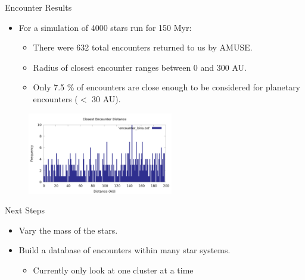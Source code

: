 \documentclass{beamer}
\begin{document}
\begin{frame}{Encounter Results}
    \begin{itemize}
        \item For a simulation of 4000 stars run for 150 Myr:
            \begin{itemize}
                \item There were 632 total encounters returned to us by AMUSE.
                \item Radius of closest encounter ranges between 0 and 300 AU.
                \item Only 7.5 \% of encounters are close enough to be
                    considered for planetary encounters ($<$ 30 AU).
            \end{itemize}
    \end{itemize}
    \begin{figure}
        \center
        \includegraphics[width=2.5in]{encounter_dist}
    \end{figure}
\end{frame}

\begin{frame}{Next Steps}
    \begin{itemize}
        \item Vary the mass of the stars.
        \item Build a database of encounters within many star systems.
        \begin{itemize}
            \item Currently only look at one cluster at a time
        \end{itemize}
    \end{itemize}
\end{frame}
\end{document}
